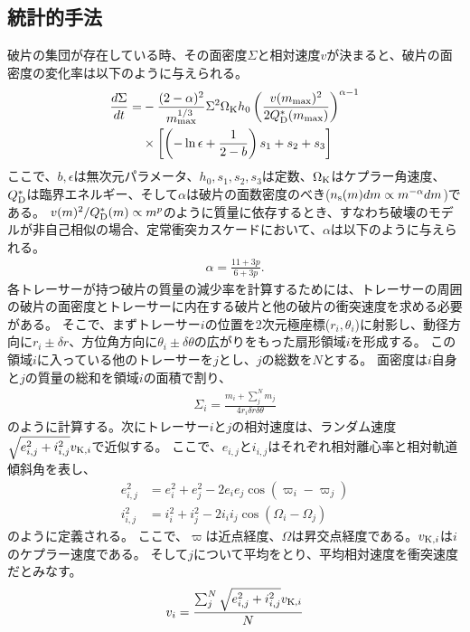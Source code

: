 \documentclass[a4paper,10pt,oneside,twocolumn,notitlepage,final]{jarticle}
\begin{document}
\subsection{統計的手法}
破片の集団が存在している時、その面密度$\Sigma$と相対速度$v$が決まると、破片の面密度の変化率は以下のように与えられる\citep{Kobayashi_Tanaka_2010}。
\begin{align}
 \frac{d \Sigma}{d t} =& - \frac{(2 - \alpha)^2}{m_{\rm max}^{1/3}} \Sigma^2 \Omega_{\rm K} h_0 \left( \frac{v(m_{\rm max})^2}{2 Q_{\rm D}^{\ast}(m_{\rm max})} \right)^{\alpha - 1} \nonumber \\
 &\times \left[ \left( - \ln \epsilon + \frac{1}{2 - b} \right) s_1 + s_2 + s_3 \right] \label{eq:tau}
\end{align}
ここで、$b,\epsilon$は無次元パラメータ、$h_0,s_1,s_2,s_3$は定数、$\Omega_{\rm K}$はケプラー角速度、$Q_{\rm D}^{\ast}$は臨界エネルギー、そして$\alpha$は破片の面数密度のべき($n_{\rm s} (m) dm \propto m^{- \alpha} dm$)である。
$v(m)^2/Q_{\rm D}^{\ast}(m) \propto m^p$のように質量に依存するとき、すなわち破壊のモデルが非自己相似の場合、定常衝突カスケードにおいて、$\alpha$は以下のように与えられる\citep{Kobayashi_Tanaka_2010}。
\begin{align}
 \alpha = \frac{11 + 3p}{6 + 3p}.
\end{align}
各トレーサーが持つ破片の質量の減少率を計算するためには、トレーサーの周囲の破片の面密度とトレーサーに内在する破片と他の破片の衝突速度を求める必要がある。
そこで、まずトレーサー$i$の位置を2次元極座標($r_i,\theta_i$)に射影し、動径方向に$r_i \pm \delta r$、方位角方向に$\theta_i \pm \delta \theta$の広がりをもった扇形領域$i$を形成する\citep{Morishima_2015}。
この領域$i$に入っている他のトレーサーを$j$とし、$j$の総数を$N$とする。
面密度は$i$自身と$j$の質量の総和を領域$i$の面積で割り、
\begin{align}
 \Sigma_i = \frac{m_i + \sum_{j}^{N} m_j}{4 r_i \delta r \delta \theta}
\end{align}
のように計算する。次にトレーサー$i$と$j$の相対速度は、ランダム速度$\sqrt{e_{i,j}^2 + i_{i,j}^2} v_{{\rm K},i}$で近似する。
ここで、$e_{i,j}$と$i_{i,j}$はそれぞれ相対離心率と相対軌道傾斜角を表し、
\begin{align}
 e_{i,j}^2 &= e_i^2 + e_j^2 - 2 e_i e_j \cos(\varpi_i - \varpi_j)\\
 i_{i,j}^2 &= i_i^2 + i_j^2 - 2 i_i i_j \cos(\Omega_i - \Omega_j)
\end{align}
のように定義される。
ここで、$\varpi$は近点経度、$\Omega$は昇交点経度である。$v_{{\rm K},i}$は$i$のケプラー速度である。
そして$j$について平均をとり、平均相対速度を衝突速度だとみなす。
\begin{align}
 v_i = \frac{\sum_{j}^{N} \sqrt{e_{i,j}^2+i_{i,j}^2} v_{{\rm K},i}}{N}
\end{align}
\end{document}
